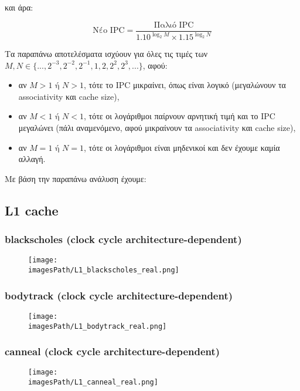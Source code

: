 \documentclass[12pt,a4paper]{article}
\newcommand{\imagesPath}{parsec-3.0/parsec_workspace/graphs}
\begin{document}
		και άρα:
		
		\[
			\text{Νέο IPC} = \dfrac{\text{Παλιό IPC}}{1.10^{\log_2 M} \times 1.15^{\log_2 N}}
		\]
		
		Τα παραπάνω αποτελέσματα ισχύουν για όλες τις τιμές των $M, N \in \{..., 2^{-3}, 2^{-2}, 2^{-1}, 1, 2, 2^2, 2^3, ...\}$, αφού:
		
		\begin{itemize}
			\item αν $M > 1 \text{ ή } N > 1$, τότε το IPC μικραίνει, όπως είναι λογικό (μεγαλώνουν τα associativity και cache size),
			\item αν $Μ < 1 \text{ ή } Ν < 1$, τότε οι λογάριθμοι παίρνουν αρνητική τιμή και το IPC μεγαλώνει (πάλι αναμενόμενο, αφού μικραίνουν τα associativity και cache size),
			\item αν $M = 1 \text{ ή } N = 1$, τότε οι λογάριθμοι είναι μηδενικοί και δεν έχουμε καμία αλλαγή.
		\end{itemize} 
	
		Με βάση την παραπάνω ανάλυση έχουμε:
		
		\subsection{L1 cache}
			\subsubsection{blackscholes (clock cycle architecture-dependent)}
				\begin{figure}[H]
					\begin{center}
						\texttt{[image: \\imagesPath/L1\_blackscholes\_real.png]}
					\end{center}
				\end{figure}
						
			\subsubsection{bodytrack (clock cycle architecture-dependent)}
				\begin{figure}[H]
					\begin{center}
						\texttt{[image: \\imagesPath/L1\_bodytrack\_real.png]}
					\end{center}
				\end{figure}
						
			\subsubsection{canneal (clock cycle architecture-dependent)}
				\begin{figure}[H]
					\begin{center}
						\texttt{[image: \\imagesPath/L1\_canneal\_real.png]}
					\end{center}
				\end{figure}
						
\end{document}
